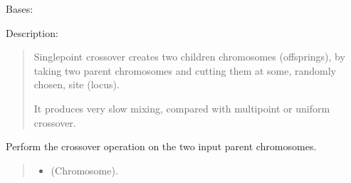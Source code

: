 \documentclass[letterpaper,10pt,english]{sphinxmanual}
\begin{document}
\begin{fulllineitems}
\label{\detokenize{pygenalgo.operators.crossover:pygenalgo.operators.crossover.single_point_crossover.SinglePointCrossover}}
\pysigstartsignatures
{}
\pysigstopsignatures
\sphinxAtStartPar
Bases: {\hyperref[\detokenize{pygenalgo.operators.crossover:pygenalgo.operators.crossover.crossover_operator.CrossoverOperator}]{}}

\sphinxAtStartPar
Description:
\begin{quote}

\sphinxAtStartPar
Single\sphinxhyphen{}point crossover creates two children chromosomes (offsprings),
by taking two parent chromosomes and cutting them at some, randomly
chosen, site (locus).

\sphinxAtStartPar
It produces very slow mixing, compared with multipoint or uniform crossover.
\end{quote}

\begin{fulllineitems}
\label{\detokenize{pygenalgo.operators.crossover:pygenalgo.operators.crossover.single_point_crossover.SinglePointCrossover.crossover}}
\pysigstartsignatures
{}
\pysigstopsignatures
\sphinxAtStartPar
Perform the crossover operation on the two input parent chromosomes.
\begin{quote}\begin{description}
\begin{itemize}
\item {} 
\sphinxAtStartPar
{} \textendash{} (Chromosome).


\end{itemize}
\end{description}
\end{quote}
\end{fulllineitems}
\end{fulllineitems}
\end{document}

